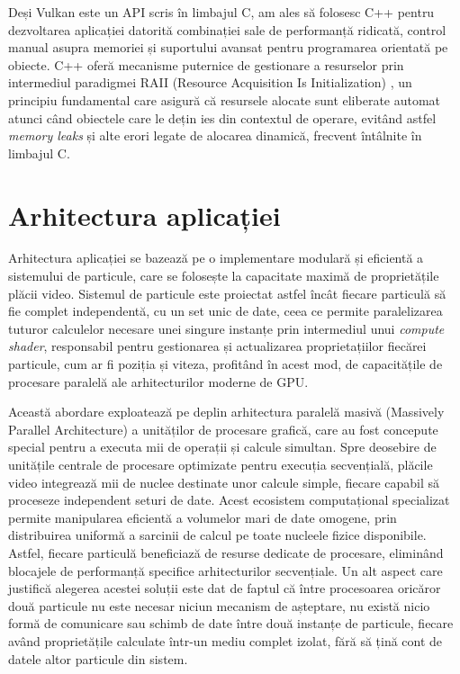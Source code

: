 Deși Vulkan este un API scris în limbajul C, am ales să folosesc C++ pentru dezvoltarea aplicației datorită combinației sale de performanță ridicată, control manual asupra memoriei și suportului avansat pentru programarea orientată pe obiecte. C++ oferă mecanisme puternice de gestionare a resurselor prin intermediul paradigmei RAII (Resource Acquisition Is Initialization) \cite{RAII_citation}, un principiu fundamental care asigură că resursele alocate sunt eliberate automat atunci când obiectele care le dețin ies din contextul de operare, evitând astfel \textit{memory leaks} și alte erori legate de alocarea dinamică, frecvent întâlnite în limbajul C. 

\section{Arhitectura aplicației}
Arhitectura aplicației se bazează pe o implementare modulară și eficientă a sistemului de particule, care se folosește la capacitate maximă de proprietățile plăcii video. Sistemul de particule este proiectat astfel încât fiecare particulă să fie complet independentă, cu un set unic de date, ceea ce permite paralelizarea tuturor calculelor necesare unei singure instanțe prin intermediul unui \textit{compute shader}, responsabil pentru gestionarea și actualizarea proprietațiilor fiecărei particule, cum ar fi poziția și viteza, profitând în acest mod, de capacitățile de procesare paralelă ale arhitecturilor moderne de GPU. 

Această abordare exploatează pe deplin arhitectura paralelă masivă \cite{ParallelArchitectures_citation} (Massively Parallel Architecture) a unităților de procesare grafică, care au fost concepute special pentru a executa mii de operații și calcule simultan. Spre deosebire de unitățile centrale de procesare optimizate pentru execuția secvențială, plăcile video integrează mii de nuclee destinate unor calcule simple, fiecare capabil să proceseze independent seturi de date. Acest ecosistem computațional specializat permite manipularea eficientă a volumelor mari de date omogene, prin distribuirea uniformă a sarcinii de calcul pe toate nucleele fizice disponibile. Astfel, fiecare particulă beneficiază de resurse dedicate de procesare, eliminând blocajele de performanță specifice arhitecturilor secvențiale. Un alt aspect care justifică alegerea acestei soluții este dat de faptul că între procesoarea oricăror două particule nu este necesar niciun mecanism de așteptare, nu există nicio formă de comunicare sau schimb de date între două instanțe de particule, fiecare având proprietățile calculate într-un mediu complet izolat, fără să țină cont de datele altor particule din sistem. 

